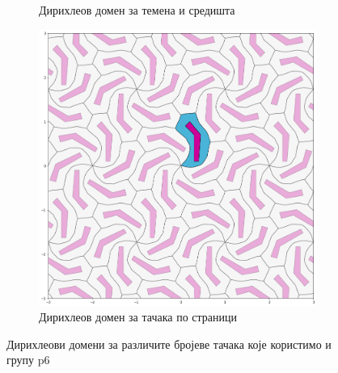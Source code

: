 \documentclass[12pt]{article}
\begin{document}
\begin{figure}[H]
\begin{subfigure}[b]{0.32\textwidth}
    \caption{Дирихлеов домен за \newline темена и средишта}
    \label{fig:dir2}
  \end{subfigure}
  \begin{subfigure}[b]{0.32\textwidth}
    \includegraphics[width=.9\textwidth]{poligon3.png}
    \caption{Дирихлеов домен за  тачака по страници}
    \label{fig:dir3}
    
  \end{subfigure}
  \caption{Дирихлеови домени за различите бројеве тачака које користимо и групу p6}
\end{figure}
\end{document}
